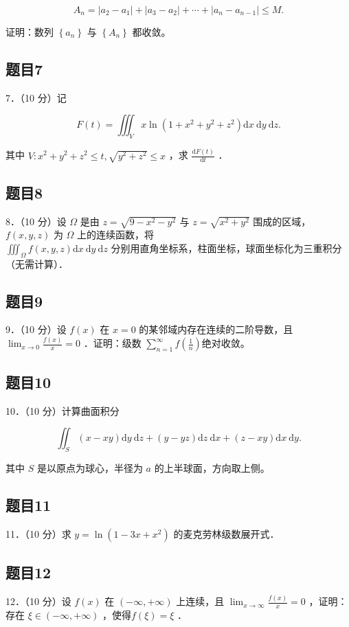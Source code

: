 \documentclass{article}
\begin{document}
\[
A_{n}=\left|a_{2}-a_{1}\right|+\left|a_{3}-a_{2}\right|+\cdots+\left|a_{n}-a_{n-1}\right| \leq M .
\]

证明：数列 \(\left\{a_{n}\right\}\) 与 \(\left\{A_{n}\right\}\) 都收敛。

\subsection{题目7}
7．（10 分）记

\[
F(t)=\iiint_{V} x \ln \left(1+x^{2}+y^{2}+z^{2}\right) \mathrm{d} x \mathrm{~d} y \mathrm{~d} z .
\]

其中 \(V: x^{2}+y^{2}+z^{2} \leq t, \sqrt{y^{2}+z^{2}} \leq x\) ，求 \(\frac{\mathrm{d} F(t)}{\mathrm{d} t}\) ．

\subsection{题目8}
8．（10 分）设 \(\Omega\) 是由 \(z=\sqrt{9-x^{2}-y^{2}}\) 与 \(z=\sqrt{x^{2}+y^{2}}\) 围成的区域，\(f(x, y, z)\) 为 \(\Omega\) 上的连续函数，将\\
\(\iiint_{\Omega} f(x, y, z) \mathrm{d} x \mathrm{~d} y \mathrm{~d} z\) 分别用直角坐标系，柱面坐标，球面坐标化为三重积分（无需计算）．

\subsection{题目9}
9．（10 分）设 \(f(x)\) 在 \(x=0\) 的某邻域内存在连续的二阶导数，且 \(\lim _{x \rightarrow 0} \frac{f(x)}{x}=0\) ．证明：级数 \(\sum_{n=1}^{\infty} f\left(\frac{1}{n}\right)\)绝对收敛。

\subsection{题目10}
10．（10 分）计算曲面积分

\[
\iint_{S}(x-x y) \mathrm{d} y \mathrm{~d} z+(y-y z) \mathrm{d} z \mathrm{~d} x+(z-x y) \mathrm{d} x \mathrm{~d} y .
\]

其中 \(S\) 是以原点为球心，半径为 \(a\) 的上半球面，方向取上侧。

\subsection{题目11}
11．（10 分）求 \(y=\ln \left(1-3 x+x^{2}\right)\) 的麦克劳林级数展开式．

\subsection{题目12}
12．（10 分）设 \(f(x)\) 在 \((-\infty,+\infty)\) 上连续，且 \(\lim _{x \rightarrow \infty} \frac{f(x)}{x}=0\) ，证明：存在 \(\xi \in(-\infty,+\infty)\) ，使得\(f(\xi)=\xi\) ．
\end{document}
